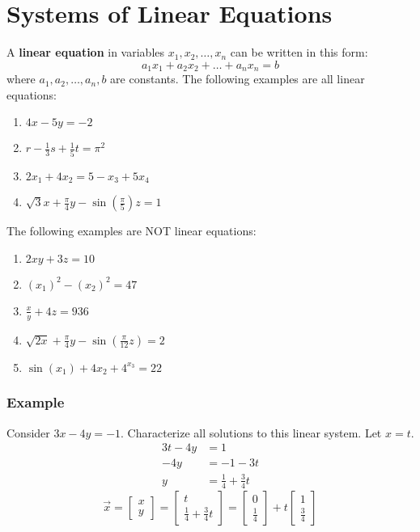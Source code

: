 \documentclass[letterpaper, 12pt]{math}
\begin{document}
\section*{Systems of Linear Equations}
A \textbf{linear equation} in variables \( x_1,x_2,\dots,x_n \) can be written
in this form:
\[ a_1x_1+a_2x_2+\dots+a_nx_n = b \]
where \( a_1,a_2,\dots,a_n,b \) are constants. The following examples are all
linear equations:
\begin{enumerate}
  \item \( 4x-5y = -2 \)
  \item \( r-\frac{1}{3}s+\frac{1}{5}t = \pi^2 \)
  \item \( 2x_1+4x_2 = 5-x_3+5x_4 \)
  \item \( \sqrt{3}x+\frac{\pi}{4}y-\sin(\frac{\pi}{5})z = 1 \)
\end{enumerate}
The following examples are NOT linear equations:
\begin{enumerate}
  \item \( 2xy+3z = 10 \)
  \item \( (x_1)^2-(x_2)^2 = 47 \)
  \item \( \frac{x}{y}+4z = 936 \)
  \item \( \sqrt{2x}+\frac{\pi}{4}y-\sin(\frac{\pi}{12}z) = 2 \)
  \item \( \sin(x_1)+4x_2+4^{x_3} = 22 \)
\end{enumerate}

\subsubsection*{Example}
Consider \( 3x-4y = -1 \). Characterize all solutions to this linear system.
Let \( x = t \).
\begin{align*}
  3t-4y &= 1 \\
  -4y &= -1-3t \\
  y &= \frac{1}{4}+\frac{3}{4}t
\end{align*}
\[ \vec{x} = \begin{bmatrix}x \\ y\end{bmatrix} =
  \begin{bmatrix}t \\ \frac{1}{4}+\frac{3}{4}t\end{bmatrix} =
  \begin{bmatrix}0 \\ \frac{1}{4}\end{bmatrix}+
  t\begin{bmatrix}1 \\ \frac{3}{4}\end{bmatrix} \]
\end{document}
